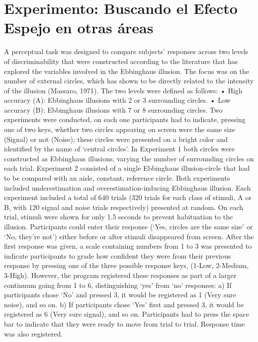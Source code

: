
\chapter{Experimento: Buscando el Efecto Espejo en otras áreas} %

\label{Cap_Exp} %



A perceptual task was designed to compare subjects’ responses across two levels of discriminability that were constructed according to the literature that has explored the variables involved in the Ebbinghaus illusion. The focus was on the number of external circles, which has shown to be directly related to the intensity of the illusion (Massaro, 1971). The two levels were defined as follows:
• High accuracy (A): Ebbinghaus illusions with 2 or 3 surrounding circles.
• Low accuracy (B): Ebbinghaus illusions with 7 or 8 surrounding circles.
Two experiments were conducted, on each one participants had to indicate, pressing one of two keys, whether two circles appearing on screen were the same size (Signal) or not (Noise); these circles were presented on a bright color and identified by the name of ‘central circles’. In Experiment 1 both circles were constructed as Ebbinghaus illusions, varying the number of surrounding circles on each trial.
Experiment 2 consisted of a single Ebbinghaus illusion-circle that had to be compared with an aisle, constant, reference circle. Both experiments included underestimation and overestimation-inducing Ebbinghaus illusion.
Each experiment included a total of 640 trials (320 trials for each class of stimuli, A or B, with 120 signal and noise trials respectively) presented at random. On each trial, stimuli were shown for only 1.5 seconds to prevent habituation to the illusion. Participants could enter their response (‘Yes, circles are the same size’ or ‘No, they’re not’) either before or after stimuli disappeared from screen.
After the first response was given, a scale containing numbers from 1 to 3 was presented to indicate participants to grade how confident they were from their previous response by pressing one of the three possible response keys, (1-Low, 2-Medium, 3-High). However, the program registered these responses as part of a larger continuum going from 1 to 6, distinguishing ‘yes’ from ‘no’ responses:
a) If participants chose ‘No’ and pressed 3, it would be registered as 1 (Very sure noise), and so on.
b) If participants chose ‘Yes’ first and pressed 3, it would be registered as 6 (Very sure signal), and so on.
Participants had to press the space bar to indicate that they were ready to move from trial to trial. Response time was also registered.


